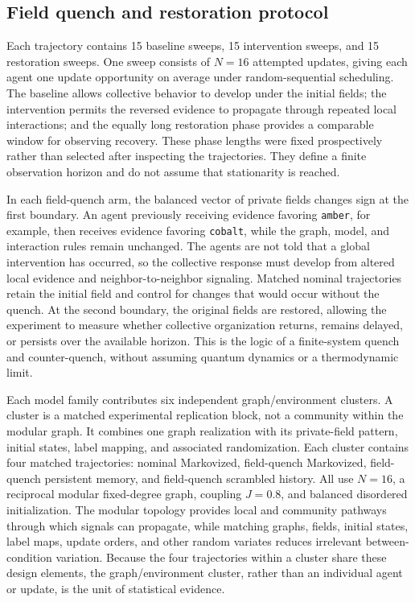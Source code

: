 \documentclass[12pt]{article}
\begin{document}
\subsection{Field quench and restoration protocol}
\label{sec:quench-protocol}

Each trajectory contains 15 baseline sweeps, 15 intervention sweeps, and 15
restoration sweeps. One sweep consists of $N=16$ attempted updates, giving each
agent one update opportunity on average under random-sequential scheduling.
The baseline allows collective behavior to develop under the initial fields;
the intervention permits the reversed evidence to propagate through repeated
local interactions; and the equally long restoration phase provides a
comparable window for observing recovery. These phase lengths were fixed
prospectively rather than selected after inspecting the trajectories. They
define a finite observation horizon and do not assume that stationarity is
reached.

In each field-quench arm, the balanced vector of private fields changes sign at
the first boundary. An agent previously receiving evidence favoring
\texttt{amber}, for example, then receives evidence favoring
\texttt{cobalt}, while the graph, model, and interaction rules remain
unchanged. The agents are not told that a global intervention has occurred, so
the collective response must develop from altered local evidence and
neighbor-to-neighbor signaling. Matched nominal trajectories retain the
initial field and control for changes that would occur without the quench. At
the second boundary, the original fields are restored, allowing the experiment
to measure whether collective organization returns, remains delayed, or
persists over the available horizon. This is the logic of a finite-system
quench and counter-quench, without assuming quantum dynamics or a
thermodynamic limit.

Each model family contributes six independent graph/environment clusters. A
cluster is a matched experimental replication block, not a community within
the modular graph. It combines one graph realization with its private-field
pattern, initial states, label mapping, and associated randomization. Each
cluster contains four matched trajectories: nominal Markovized, field-quench
Markovized, field-quench persistent memory, and field-quench scrambled
history. All use $N=16$, a reciprocal modular fixed-degree graph, coupling
$J=0.8$, and balanced disordered initialization. The modular topology provides
local and community pathways through which signals can propagate, while
matching graphs, fields, initial states, label maps, update orders, and other
random variates reduces irrelevant between-condition variation. Because the
four trajectories within a cluster share these design elements, the
graph/environment cluster, rather than an individual agent or update, is the
unit of statistical evidence.
\end{document}
